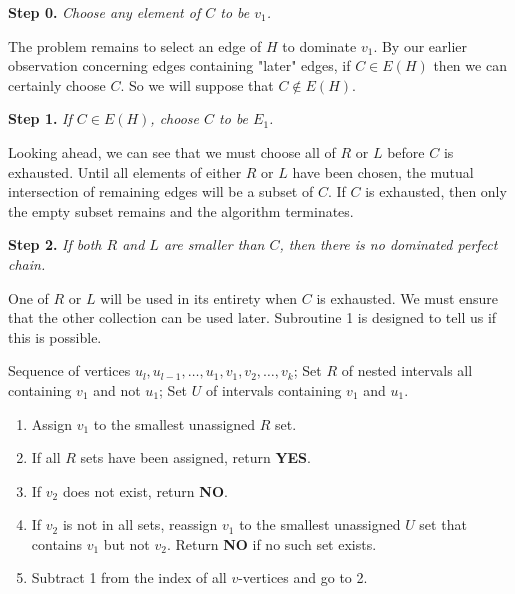 \begin{framed}{\bf Step 0.} {\it Choose any element of $C$ to be $v_1$.}
\end{framed}

The problem remains to select an edge of $H$ to dominate $v_1$.  
%
By our earlier observation concerning edges containing "later" edges, if $C \in E(H)$ then we can certainly choose $C$.  So we will suppose that $C \notin E(H)$.
%

\begin{framed}{\bf Step 1.}  {\it If $C \in E(H)$, choose $C$ to be $E_1$.}
\end{framed}

Looking ahead,  we can see that we must choose all of $R$ or $L$ before $C$ is exhausted.  
%
Until all elements of either $R$ or $L$ have been chosen, the mutual intersection of remaining edges will be a subset of $C$.  
%
If $C$ is exhausted, then only the empty subset remains and the algorithm terminates.
%

\begin{framed}{\bf Step 2.} {\it If both $R$ and $L$ are smaller than $C$, then there is no dominated perfect chain.}
\end{framed}

One of $R$ or $L$ will be used in its entirety when $C$ is exhausted.  
%
We must ensure that the other collection can be used later.
%  
Subroutine 1 is designed to tell us if this is possible.
%
\begin{framed}

 Sequence of vertices $u_l, u_{l-1},\ldots,u_1,v_1,v_2,\ldots,v_k$; Set $R$ of nested intervals all containing $v_1$ and not $u_1$; Set $U$ of intervals containing $v_1$ and $u_1$. 

\begin{enumerate}
	\item Assign $v_1$ to the smallest unassigned $R$ set.
	\item If all $R$ sets have been assigned, return {\bf YES}. 
	\item  If $v_2$ does not exist, return {\bf NO}.
	\item If $v_2$ is not in all sets, reassign $v_1$ to the smallest unassigned $U$ set that contains $v_1$ but not $v_2$.  Return {\bf NO} if no such set exists.
	\item Subtract 1 from the index of all $v$-vertices and go to 2.
\end{enumerate}
\end{framed}

